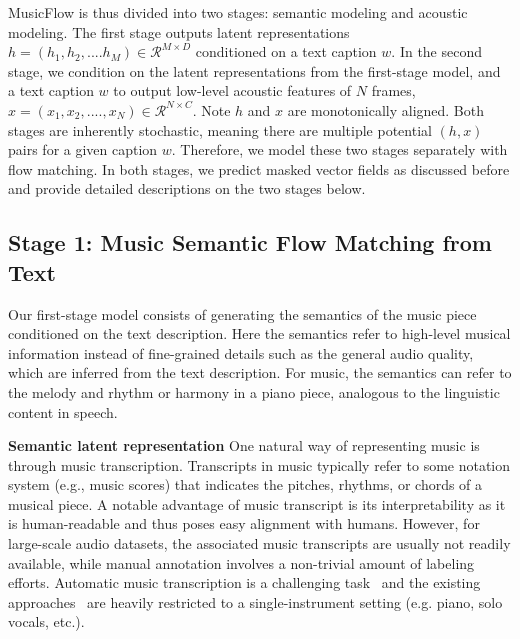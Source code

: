 MusicFlow is thus divided into two stages: semantic modeling and acoustic modeling. The first stage outputs latent representations $h = (h_1, h_2,....h_M) \in \mathcal{R}^{M\times D}$ conditioned on a text caption $w$. In the second stage, we condition on the latent representations from the first-stage model, and a text caption $w$ to output low-level acoustic features of $N$ frames, $x = (x_1, x_2, ...., x_N) \in \mathcal{R}^{N\times C}$. Note $h$ and $x$ are monotonically aligned. Both stages are inherently stochastic, meaning there are multiple potential $(h,x)$ pairs for a given caption $w$. Therefore, we model these two stages separately with flow matching. In both stages, we predict masked vector fields as discussed before and provide detailed descriptions on the two stages below. 

\subsection{Stage 1: Music Semantic Flow Matching from Text}

Our first-stage model consists of generating the semantics of the music piece conditioned on the text description. Here the semantics refer to high-level musical information instead of fine-grained details such as the general audio quality, which are inferred from the text description. For music, the semantics can refer to the melody and rhythm or harmony in a piano piece, analogous to the linguistic content in speech. 

\textbf{Semantic latent representation}
One natural way of representing music is through music transcription.
Transcripts in music typically refer to some notation system (e.g., music scores) that indicates the pitches, rhythms, or chords of a musical piece.
A notable advantage of music transcript is its interpretability as it is human-readable and thus poses easy alignment with humans. However, for large-scale audio datasets, the associated music transcripts are usually not readily available, while manual annotation involves a non-trivial amount of labeling efforts. Automatic music transcription is a challenging task~\cite{Benetos2019Automatic} and the existing approaches~\cite{Bittner2022ALI,Hawthorne2021SequencetoSequencePT,hsu2021vocano,Su2019tent,Hawthorne2018EnablingFP} are heavily restricted to a single-instrument setting (e.g.
piano, solo vocals, etc.). 

